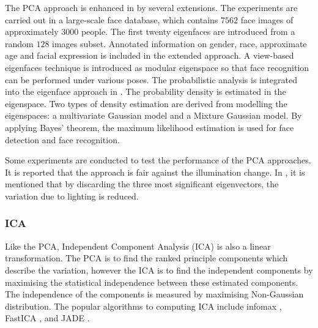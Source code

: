 The PCA approach is enhanced in \cite{Pentland1994} by several extensions. The experiments are carried out in a large-scale face database, which contains $7562$ face images of approximately $3000$ people. The first twenty eigenfaces are introduced from a random $128$ images subset. Annotated information on gender, race, approximate age and facial expression is included in the extended approach. A view-based eigenfaces technique is introduced as modular eigenspace so that face recognition can be performed under various poses. The probabilistic analysis is integrated into the eigenface approach in \cite{Moghaddam1997}. The probability density is estimated in the eigenspace. Two types of density estimation are derived from modelling the eigenspaces: a multivariate Gaussian model and a Mixture Gaussian model. By applying Bayes' theorem, the maximum likelihood estimation is used for face detection and face recognition.

Some experiments are conducted to test the performance of the PCA approaches. It is reported that the approach is fair against the illumination change. In \cite{Belhumeur1997}, it is mentioned that by discarding the three most significant eigenvectors, the variation due to lighting is reduced. %

\subsubsection{ICA}
Like the PCA, Independent Component Analysis (ICA) is also a linear transformation. The PCA is to find the ranked principle components which describe the variation, however the ICA is to find the independent components by maximising the statistical independence between these estimated components. The independence of the components is measured by maximising Non-Gaussian distribution. The popular algorithms to computing ICA include infomax \cite{Bell1995}, FastICA \cite{Hyvarinen1999,Hyvarinen2001}, and JADE \cite{Cardoso1996}.

